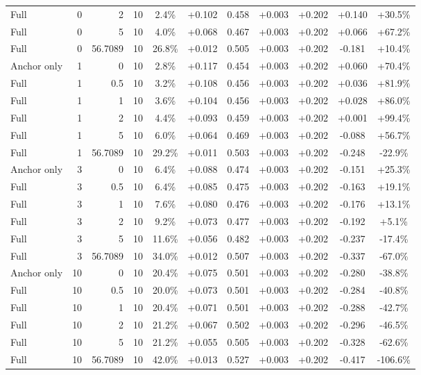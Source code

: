 \begin{table}[htbp]
\begin{tabular}{lrrrccccccc}
Full & 0 & 2 & 10 & 2.4\% & +0.102 & 0.458 & +0.003 & +0.202 & +0.140 & +30.5\% \\
Full & 0 & 5 & 10 & 4.0\% & +0.068 & 0.467 & +0.003 & +0.202 & +0.066 & +67.2\% \\
Full & 0 & 56.7089 & 10 & 26.8\% & +0.012 & 0.505 & +0.003 & +0.202 & -0.181 & +10.4\% \\
Anchor only & 1 & 0 & 10 & 2.8\% & +0.117 & 0.454 & +0.003 & +0.202 & +0.060 & +70.4\% \\
Full & 1 & 0.5 & 10 & 3.2\% & +0.108 & 0.456 & +0.003 & +0.202 & +0.036 & +81.9\% \\
Full & 1 & 1 & 10 & 3.6\% & +0.104 & 0.456 & +0.003 & +0.202 & +0.028 & +86.0\% \\
Full & 1 & 2 & 10 & 4.4\% & +0.093 & 0.459 & +0.003 & +0.202 & +0.001 & +99.4\% \\
Full & 1 & 5 & 10 & 6.0\% & +0.064 & 0.469 & +0.003 & +0.202 & -0.088 & +56.7\% \\
Full & 1 & 56.7089 & 10 & 29.2\% & +0.011 & 0.503 & +0.003 & +0.202 & -0.248 & -22.9\% \\
Anchor only & 3 & 0 & 10 & 6.4\% & +0.088 & 0.474 & +0.003 & +0.202 & -0.151 & +25.3\% \\
Full & 3 & 0.5 & 10 & 6.4\% & +0.085 & 0.475 & +0.003 & +0.202 & -0.163 & +19.1\% \\
Full & 3 & 1 & 10 & 7.6\% & +0.080 & 0.476 & +0.003 & +0.202 & -0.176 & +13.1\% \\
Full & 3 & 2 & 10 & 9.2\% & +0.073 & 0.477 & +0.003 & +0.202 & -0.192 & +5.1\% \\
Full & 3 & 5 & 10 & 11.6\% & +0.056 & 0.482 & +0.003 & +0.202 & -0.237 & -17.4\% \\
Full & 3 & 56.7089 & 10 & 34.0\% & +0.012 & 0.507 & +0.003 & +0.202 & -0.337 & -67.0\% \\
Anchor only & 10 & 0 & 10 & 20.4\% & +0.075 & 0.501 & +0.003 & +0.202 & -0.280 & -38.8\% \\
Full & 10 & 0.5 & 10 & 20.0\% & +0.073 & 0.501 & +0.003 & +0.202 & -0.284 & -40.8\% \\
Full & 10 & 1 & 10 & 20.4\% & +0.071 & 0.501 & +0.003 & +0.202 & -0.288 & -42.7\% \\
Full & 10 & 2 & 10 & 21.2\% & +0.067 & 0.502 & +0.003 & +0.202 & -0.296 & -46.5\% \\
Full & 10 & 5 & 10 & 21.2\% & +0.055 & 0.505 & +0.003 & +0.202 & -0.328 & -62.6\% \\
Full & 10 & 56.7089 & 10 & 42.0\% & +0.013 & 0.527 & +0.003 & +0.202 & -0.417 & -106.6\% \\

\end{tabular}
\end{table}
